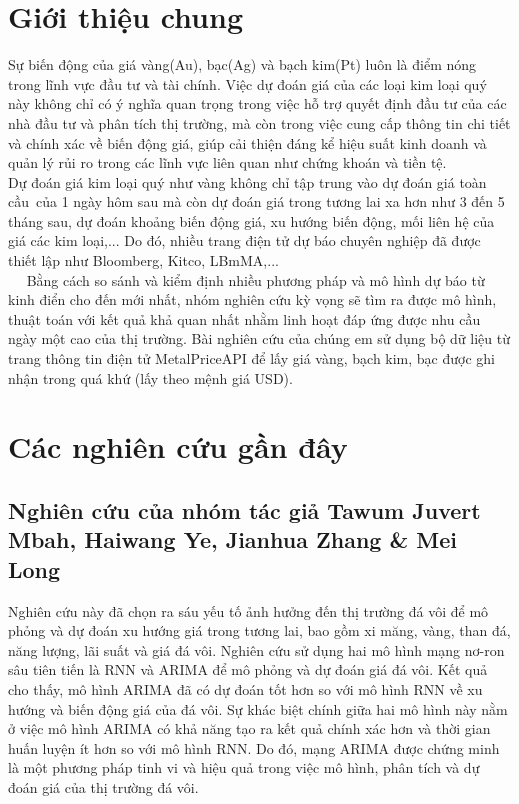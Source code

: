 \documentclass[conference]{IEEEtran}
\begin{document}
\section{Giới thiệu chung}
Sự biến động của giá vàng(Au), bạc(Ag) và bạch kim(Pt) luôn là điểm nóng trong lĩnh vực đầu tư và tài chính. Việc dự đoán giá của các loại kim loại quý này không chỉ có ý nghĩa quan trọng trong việc hỗ trợ quyết định đầu tư của các nhà đầu tư và phân tích thị trường, mà còn trong việc cung cấp thông tin chi tiết và chính xác về biến động giá, giúp cải thiện đáng kể hiệu suất kinh doanh và quản lý rủi ro trong các lĩnh vực liên quan như chứng khoán và tiền tệ. \\ 
Dự đoán giá kim loại quý như vàng không chỉ tập trung vào dự đoán giá toàn cầu  của 1 ngày hôm sau mà còn dự đoán giá trong tương lai xa hơn như 3 đến 5 tháng sau, dự đoán khoảng biến động giá, xu hướng biến động, mối liên hệ của giá các kim loại,... Do đó, nhiều trang điện tử dự báo chuyên nghiệp đã được thiết lập như Bloomberg, Kitco, LBmMA,... \\
      	Bằng cách so sánh và kiểm định nhiều phương pháp và mô hình dự báo từ kinh điển cho đến mới nhất, nhóm nghiên cứu kỳ vọng sẽ tìm ra được mô hình, thuật toán với kết quả khả quan nhất nhằm linh hoạt đáp ứng được nhu cầu ngày một cao của thị trường. Bài nghiên cứu của chúng em sử dụng bộ dữ liệu từ trang thông tin điện tử MetalPriceAPI để lấy giá vàng, bạch kim, bạc được ghi nhận trong quá khứ (lấy theo mệnh giá USD). 
\section{Các nghiên cứu gần đây}

\subsection{Nghiên cứu của nhóm tác giả Tawum Juvert Mbah, Haiwang Ye, Jianhua Zhang & Mei Long}

Nghiên cứu này đã chọn ra sáu yếu tố ảnh hưởng đến thị trường đá vôi để mô phỏng và dự đoán xu hướng giá trong tương lai, bao gồm xi măng, vàng, than đá, năng lượng, lãi suất và giá đá vôi. Nghiên cứu sử dụng hai mô hình mạng nơ-ron sâu tiên tiến là RNN và ARIMA để mô phỏng và dự đoán giá đá vôi. Kết quả cho thấy, mô hình ARIMA đã có dự đoán tốt hơn so với mô hình RNN về xu hướng và biến động giá của đá vôi. Sự khác biệt chính giữa hai mô hình này nằm ở việc mô hình ARIMA có khả năng tạo ra kết quả chính xác hơn và thời gian huấn luyện ít hơn so với mô hình RNN. Do đó, mạng ARIMA được chứng minh là một phương pháp tinh vi và hiệu quả trong việc mô hình, phân tích và dự đoán giá của thị trường đá vôi.
\end{document}
